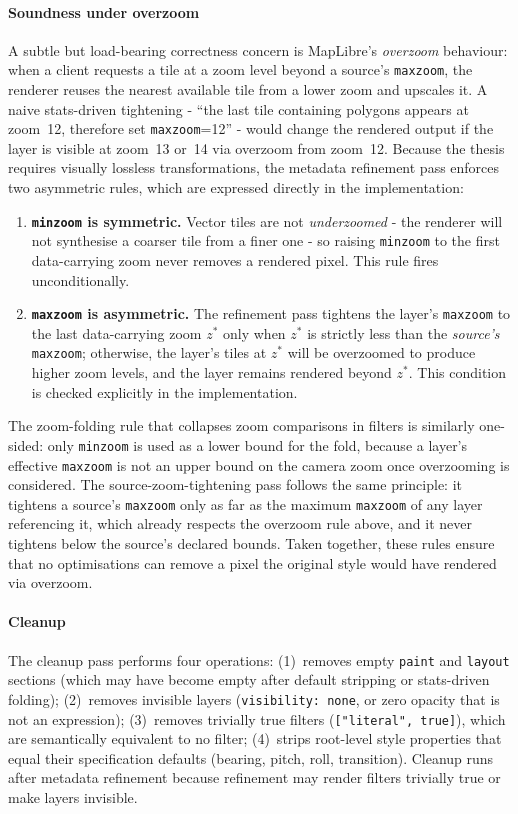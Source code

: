 \paragraph{Soundness under overzoom}
A subtle but load-bearing correctness concern is MapLibre's \emph{overzoom} behaviour: when a client requests a tile at a zoom level beyond a source's \texttt{maxzoom}, the renderer reuses the nearest available tile from a lower zoom and upscales it.
A naive stats-driven tightening - \enquote{the last tile containing polygons appears at zoom~12, therefore set \texttt{maxzoom}=12} - would change the rendered output if the layer is visible at zoom~13 or~14 via overzoom from zoom~12.
Because the thesis requires visually lossless transformations, the metadata refinement pass enforces two asymmetric rules, which are expressed directly in the implementation:
\begin{enumerate}
    \item \textbf{\texttt{minzoom} is symmetric.}
    Vector tiles are not \emph{underzoomed} - the renderer will not synthesise a coarser tile from a finer one - so raising \texttt{minzoom} to the first data-carrying zoom never removes a rendered pixel.
    This rule fires unconditionally.
    \item \textbf{\texttt{maxzoom} is asymmetric.}
    The refinement pass tightens the layer's \texttt{maxzoom} to the last data-carrying zoom $z^{*}$ only when $z^{*}$ is strictly less than the \emph{source's} \texttt{maxzoom}; otherwise, the layer's tiles at $z^{*}$ will be overzoomed to produce higher zoom levels, and the layer remains rendered beyond $z^{*}$.
    This condition is checked explicitly in the implementation.
\end{enumerate}
The zoom-folding rule that collapses zoom comparisons in filters is similarly one-sided: only \texttt{minzoom} is used as a lower bound for the fold, because a layer's effective \texttt{maxzoom} is not an upper bound on the camera zoom once overzooming is considered.
The source-zoom-tightening pass follows the same principle: it tightens a source's \texttt{maxzoom} only as far as the maximum \texttt{maxzoom} of any layer referencing it, which already respects the overzoom rule above, and it never tightens below the source's declared bounds.
Taken together, these rules ensure that no optimisations can remove a pixel the original style would have rendered via overzoom.

\paragraph{Cleanup}
The cleanup pass performs four operations:
(1)~removes empty \texttt{paint} and \texttt{layout} sections (which may have become empty after default stripping or stats-driven folding);
(2)~removes invisible layers (\texttt{visibility:~none}, or zero opacity that is not an expression);
(3)~removes trivially true filters (\texttt{["literal",~true]}), which are semantically equivalent to no filter;
(4)~strips root-level style properties that equal their specification defaults (bearing, pitch, roll, transition).
Cleanup runs after metadata refinement because refinement may render filters trivially true or make layers invisible.

